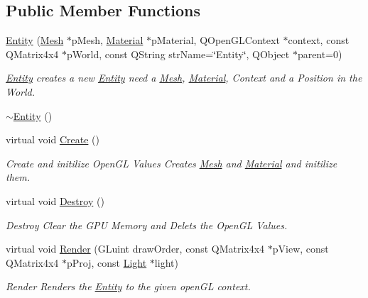 \subsection*{Public Member Functions}
\begin{DoxyCompactItemize}
\item 
\hyperlink{class_entity_acf4f8570960b2173a894a99ec9967215}{Entity} (\hyperlink{class_mesh}{Mesh} $\ast$p\+Mesh, \hyperlink{class_material}{Material} $\ast$p\+Material, Q\+Open\+G\+L\+Context $\ast$context, const Q\+Matrix4x4 $\ast$p\+World, const Q\+String str\+Name=\char`\"{}Entity\char`\"{}, Q\+Object $\ast$parent=0)
\begin{DoxyCompactList}\small\item\em \hyperlink{class_entity}{Entity} creates a new \hyperlink{class_entity}{Entity} need a \hyperlink{class_mesh}{Mesh}, \hyperlink{class_material}{Material}, Context and a Position in the World. \end{DoxyCompactList}\item 
\hyperlink{class_entity_adf6d3f7cb1b2ba029b6b048a395cc8ae}{$\sim$\+Entity} ()
\item 
virtual void \hyperlink{class_entity_a647d154620c6464168f3b088f0ac170e}{Create} ()
\begin{DoxyCompactList}\small\item\em Create and initilize Open\+G\+L Values Creates \hyperlink{class_mesh}{Mesh} and \hyperlink{class_material}{Material} and initilize them. \end{DoxyCompactList}\item 
virtual void \hyperlink{class_entity_aa75151fc607686b42d27f8c3ba73143d}{Destroy} ()
\begin{DoxyCompactList}\small\item\em Destroy Clear the G\+P\+U Memory and Delets the Open\+G\+L Values. \end{DoxyCompactList}\item 
virtual void \hyperlink{class_entity_a0f3f11bbb868ab96e5bbb0f835eb9966}{Render} (G\+Luint draw\+Order, const Q\+Matrix4x4 $\ast$p\+View, const Q\+Matrix4x4 $\ast$p\+Proj, const \hyperlink{class_light}{Light} $\ast$light)
\begin{DoxyCompactList}\small\item\em Render Renders the \hyperlink{class_entity}{Entity} to the given open\+G\+L context. \end{DoxyCompactList}\end{DoxyCompactItemize}
